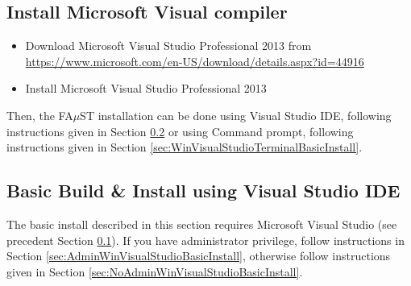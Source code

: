 
\subsection{Install Microsoft Visual compiler}\label{sec:WinInstallCompilerVS} 

\begin{itemize}
\item Download Microsoft Visual Studio Professional 2013 from \url{https://www.microsoft.com/en-US/download/details.aspx?id=44916}
\item Install Microsoft Visual Studio Professional 2013
\end{itemize}
Then, the FA$\mu$ST installation can be done using Visual Studio IDE, following instructions given in Section \ref{sec:WinVisualStudioBasicInstall} or using Command prompt, following instructions given in Section \ref{sec:WinVisualStudioTerminalBasicInstall}. 

\subsection{Basic Build \& Install using Visual Studio IDE}\label{sec:WinVisualStudioBasicInstall}
The basic install described in this section requires Microsoft Visual Studio (see precedent Section \ref{sec:WinInstallCompilerVS}).
If you have administrator privilege, follow instructions in Section \ref{sec:AdminWinVisualStudioBasicInstall}, otherwise follow instructions given in Section \ref{sec:NoAdminWinVisualStudioBasicInstall}.

